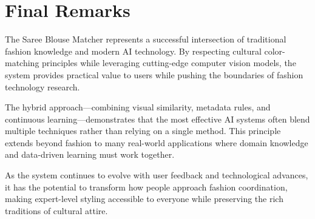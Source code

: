 \documentclass[12pt,a4paper]{report}
\begin{document}
\section{Final Remarks}

The Saree Blouse Matcher represents a successful intersection of traditional fashion knowledge and modern AI technology. By respecting cultural color-matching principles while leveraging cutting-edge computer vision models, the system provides practical value to users while pushing the boundaries of fashion technology research.

The hybrid approach—combining visual similarity, metadata rules, and continuous learning—demonstrates that the most effective AI systems often blend multiple techniques rather than relying on a single method. This principle extends beyond fashion to many real-world applications where domain knowledge and data-driven learning must work together.

As the system continues to evolve with user feedback and technological advances, it has the potential to transform how people approach fashion coordination, making expert-level styling accessible to everyone while preserving the rich traditions of cultural attire.
\end{document}
